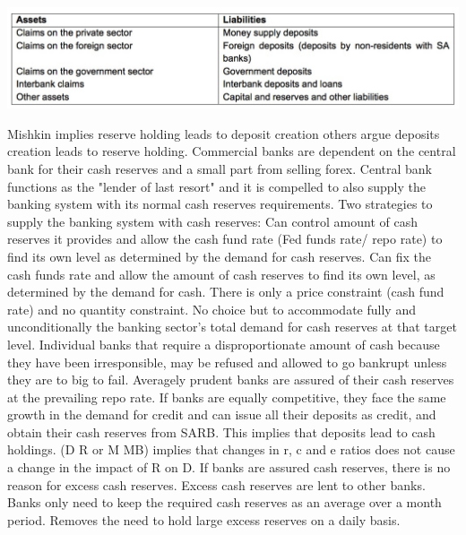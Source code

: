 \documentclass[12pt]{examnotes}
\begin{document}
\vspace{6pt}
\includegraphics[scale=0.5]{./imgs/153.jpg}

\ra Mishkin implies reserve holding leads to deposit creation others argue deposits creation leads to reserve holding.
\ra Commercial banks are dependent on the central bank for their cash reserves and a small part from selling forex.
\ra Central bank functions as the "lender of last resort" and it is compelled to also supply the banking system with its normal cash reserves requirements.
\ra Two strategies to supply the banking system with cash reserves:
 Can control amount of cash reserves it provides and allow the cash fund rate (Fed funds rate/ repo rate) to find its own level as determined by the demand for cash reserves.
 Can fix the cash funds rate and allow the amount of cash reserves to find its own level, as determined by the demand for cash.
\rna There is only a price constraint (cash fund rate) and no quantity constraint.
\rna No choice but to accommodate fully and unconditionally the banking sector's total demand for cash reserves at that target level.
\rna Individual banks that require a disproportionate amount of cash because they have been  irresponsible, may be refused and allowed to go bankrupt unless they are to big to fail.
\rna Averagely prudent banks are assured of their cash reserves at the prevailing repo rate. 
\rna If banks are equally competitive, they face the same growth in the demand for credit and can issue all their deposits as credit, and obtain their cash reserves from SARB. This implies that deposits lead to cash holdings.
\rna (D \ra R or M \ra MB) implies that changes in r, c and e ratios does not cause a change in the impact of R on D.
\rna If banks are assured cash reserves, there is no reason for excess cash reserves. Excess cash reserves are lent to other banks.
\rna Banks only need to keep the required cash reserves as an average over a month period. Removes the need to hold large excess reserves on a daily basis.

\end{document}

